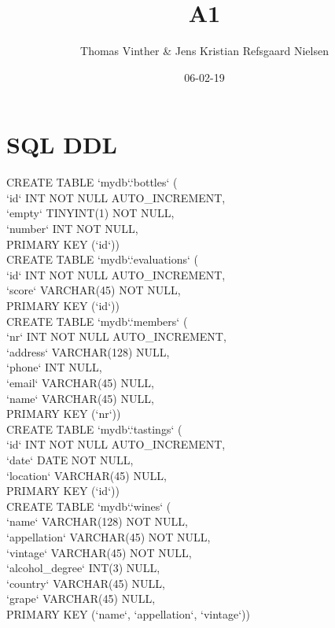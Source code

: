 \documentclass{article}
\theoremstyle{remark}
\numberwithin{equation}{section}
\begin{document}
	\author{Thomas Vinther \& Jens Kristian Refsgaard Nielsen}
	\title{A1}
	\date{06-02-19}
	\maketitle
\section*{SQL DDL}
CREATE TABLE `mydb`.`bottles` (\\
\indent`id` INT NOT NULL AUTO\_INCREMENT,\\
\indent`empty` TINYINT(1) NOT NULL,\\
\indent`number` INT NOT NULL,\\
\indent PRIMARY KEY (`id`))\\
CREATE TABLE `mydb`.`evaluations` (\\
\indent`id` INT NOT NULL AUTO\_INCREMENT,\\
\indent`score` VARCHAR(45) NOT NULL,\\
\indent PRIMARY KEY (`id`))\\
CREATE TABLE `mydb`.`members` (\\
\indent`nr` INT NOT NULL AUTO\_INCREMENT,\\
\indent`address` VARCHAR(128) NULL,\\
\indent`phone` INT NULL,\\
\indent`email` VARCHAR(45) NULL,\\
\indent`name` VARCHAR(45) NULL,\\
\indent PRIMARY KEY (`nr`))\\
CREATE TABLE `mydb`.`tastings` (\\
\indent`id` INT NOT NULL AUTO\_INCREMENT,\\
\indent`date` DATE NOT NULL,\\
\indent `location` VARCHAR(45) NULL,\\
\indent PRIMARY KEY (`id`))\\
CREATE TABLE `mydb`.`wines` (\\
\indent`name` VARCHAR(128) NOT NULL,\\
\indent`appellation` VARCHAR(45) NOT NULL,\\
\indent`vintage` VARCHAR(45) NOT NULL,\\
\indent`alcohol\_degree` INT(3) NULL,\\
\indent`country` VARCHAR(45) NULL,\\
\indent`grape` VARCHAR(45) NULL,\\
\indent PRIMARY KEY (`name`, `appellation`, `vintage`))\\
\end{document}
